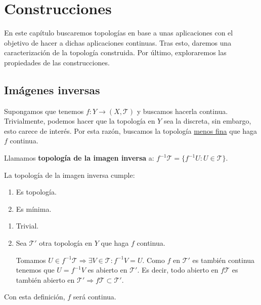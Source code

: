 \chapter{Construcciones}%
\label{cha:construcciones}
En este capítulo buscaremos topologías en base a unas aplicaciones con el objetivo de hacer a dichas aplicaciones continuas. Tras esto, daremos una caracterización de la topología construida. Por último, exploraremos las propiedades de las construcciones.

\section{Imágenes inversas}%
\label{sec:imagenes_inversas}
Supongamos que tenemos $f: Y \rightarrow \left( X, \mathcal{T} \right)$ y buscamos hacerla continua. Trivialmente, podemos hacer que la topología en $Y$ sea la discreta, sin embargo, esto carece de interés. Por esta razón, buscamos la topología \underline{menos fina} que haga $f$ continua. 
\begin{defi}    
Llamamos \textbf{topología de la imagen inversa} a: $f^{-1} \mathcal{T} = \{f^{-1}U: U \in \mathcal{T}\}$.
\end{defi}
\begin{prop}    
La topología de la imagen inversa cumple:
\begin{enumerate}
    \item Es topología. 
    \item Es mínima. 
\end{enumerate}
\end{prop}
\begin{demo}
\begin{enumerate}
    \item Trivial.
    \item Sea $\mathcal{T}'$ otra topología en $Y$ que haga $f$ continua. 

    Tomamos $U \in f^{-1}\mathcal{T} \Rightarrow \exists V \in \mathcal{T}: f^{-1}V = U$. Como $f$ en $\mathcal{T}'$ es también continua tenemos que $U = f^{-1}V$ es abierto en $\mathcal{T}'$. Es decir, todo abierto en $f\mathcal{T}$ es también abierto en $\mathcal{T}' \Rightarrow \boxed{f \mathcal{T} \subset \mathcal{T}'}$.
\end{enumerate}
\end{demo}

\begin{obs}
    Con esta definición, $f$ será continua.
\end{obs}


